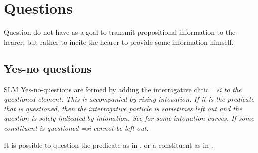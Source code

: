 \\

 \\
\section{Questions}\label{sec:func:Questions}
Question do not have as a goal to transmit propositional information to the hearer, but rather to incite the hearer to provide some information himself.

\subsection{Yes-no questions}\label{sec:func:Yes-noquestions}
SLM Yes-no-questions are formed by adding the interrogative clitic \em=si \em to the questioned element. This is accompanied by rising intonation. If it is the predicate that is questioned, then the interrogative particle is sometimes left out and the question is solely indicated by intonation. See  for some intonation curves. If some constituent is questioned \em =si \em cannot be left out.

It is possible to question the predicate as in , or a constituent as in .



